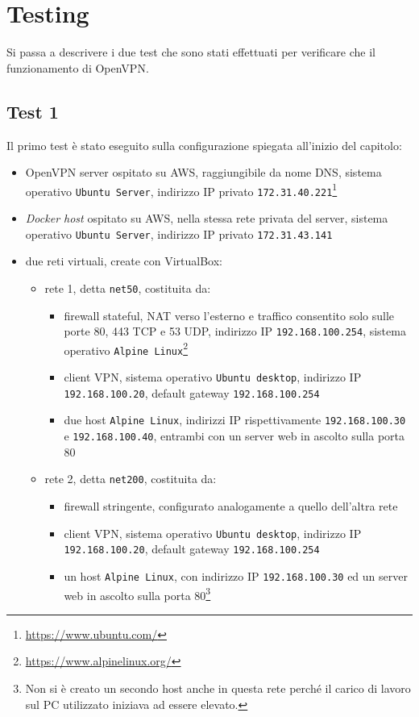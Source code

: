 \section{Testing}
Si passa a descrivere
i due test che sono stati effettuati per verificare che il funzionamento di OpenVPN.

\subsection{Test 1}
Il primo test è stato eseguito sulla configurazione spiegata all'inizio del capitolo:
\begin{itemize}
  \item OpenVPN server ospitato su AWS, raggiungibile da nome DNS, sistema
  operativo \texttt{Ubuntu Server}, indirizzo IP privato \texttt{172.31.40.221}\footnote{\url{https://www.ubuntu.com/}}
  \item \textit{Docker host} ospitato su AWS, nella stessa rete privata del
  server, sistema
  operativo \texttt{Ubuntu Server}, indirizzo IP privato \texttt{172.31.43.141}
  \item due reti virtuali, create con VirtualBox:
  \begin{itemize}
    \item rete 1, detta \texttt{net50}, costituita da:
    \begin{itemize}
      \item firewall stateful, NAT verso l'esterno e traffico consentito solo
      sulle porte 80, 443 TCP e 53 UDP, indirizzo IP \texttt{192.168.100.254},
      sistema operativo \texttt{Alpine Linux}\footnote{\url{https://www.alpinelinux.org/}}
      \item client VPN, sistema operativo \texttt{Ubuntu desktop}, indirizzo
      IP \texttt{192.168.100.20}, default gateway \texttt{192.168.100.254}
      \item due host \texttt{Alpine Linux}, indirizzi IP rispettivamente
      \texttt{192.168.100.30} e \texttt{192.168.100.40}, entrambi con un server
      web in ascolto sulla porta 80
    \end{itemize}
    \item rete 2, detta \texttt{net200}, costituita da:
    \begin{itemize}
      \item firewall stringente, configurato analogamente a quello dell'altra rete
      \item client VPN, sistema operativo \texttt{Ubuntu desktop}, indirizzo
      IP \texttt{192.168.100.20}, default gateway \texttt{192.168.100.254}
      \item un host \texttt{Alpine Linux}, con indirizzo IP
      \texttt{192.168.100.30} ed un server
      web in ascolto sulla porta 80\footnote{Non si è creato un secondo host anche
      in questa rete perché il carico di lavoro sul PC utilizzato iniziava ad
      essere elevato.}
    \end{itemize}
  \end{itemize}
\end{itemize}
